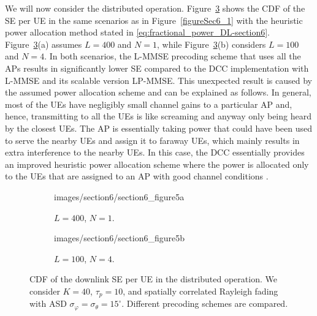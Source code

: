 We will now consider the distributed operation. Figure~\ref{figureSec6_3} shows the CDF of the SE per UE in the same scenarios as in Figure~\ref{figureSec6_1} with the heuristic power allocation method stated in \eqref{eq:fractional_power_DL-section6}.
Figure~\ref{figureSec6_3}(a) assumes $L=400$ and $N=1$, while Figure~\ref{figureSec6_3}(b) considers $L=100$ and $N=4$. In both scenarios, the L-MMSE precoding scheme that uses all the APs results in significantly lower SE compared to the DCC implementation with L-MMSE and its scalable version LP-MMSE. This unexpected result is caused by the assumed power allocation scheme and can be explained as follows. In general, most of the UEs have negligibly small channel gains to a particular AP and, hence, transmitting to all the UEs is like screaming and anyway only being heard by the closest UEs. The AP is essentially taking power that could have been used to serve the nearby UEs and assign it to faraway UEs, which mainly results in extra interference to the nearby UEs.
In this case, the DCC essentially provides an improved heuristic power allocation scheme where the power is allocated only to the UEs that are assigned to an AP with good channel conditions \cite{Buzzi2017b}.

\begin{figure}[p!]
	\begin{subfigure}[b]{\columnwidth} \centering 
		\begin{overpic}[width=0.88\columnwidth,tics=10]{images/section6/section6_figure5a}
		\end{overpic} \label{figureSec6_3a}
		\caption{$L=400$, $N=1$.} 
		\vspace{4mm}
	\end{subfigure} 
	\begin{subfigure}[b]{\columnwidth} \centering 
		\begin{overpic}[width=0.88\columnwidth,tics=10]{images/section6/section6_figure5b}
		\end{overpic} \label{figureSec6_3b}
		\caption{$L=100$, $N=4$.} 
	\end{subfigure} 
	\caption{CDF of the downlink SE per UE in the distributed operation. We consider $K=40$, $\tau_p=10$, and spatially correlated Rayleigh  fading with ASD $\sigma_{\varphi}=\sigma_{\theta}=15^{\circ}$. Different precoding schemes are compared.}\label{figureSec6_3}
\end{figure}

